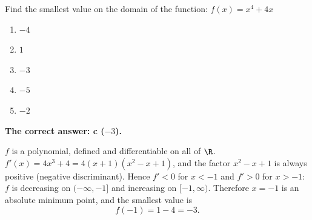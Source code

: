 
\begin{question}
Find the smallest value on the domain of the function: $f(x)=x^4+4x$
\begin{enumerate}
  \item $-4$
  \item $1$
  \item $-3$
  \item $-5$
  \item $-2$
\end{enumerate}
\end{question}

\begin{solution}
\textbf{The correct answer: c ($-3$).}

$f$ is a polynomial, defined and differentiable on all of $\R$. $f'(x)=4x^3+4=4(x+1)(x^2-x+1)$, and the factor $x^2-x+1$ is always positive (negative discriminant). Hence $f'<0$ for $x<-1$ and $f'>0$ for $x>-1$: $f$ is decreasing on $(-\infty,-1]$ and increasing on $[-1,\infty)$. Therefore $x=-1$ is an absolute minimum point, and the smallest value is
\[ f(-1)=1-4=-3 . \]
\end{solution}
